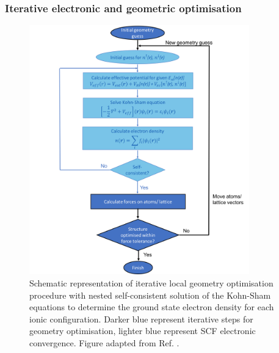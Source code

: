 \documentclass[11pt, twoside]{report}
\begin{document}
\subsubsection{Iterative electronic and geometric optimisation}
\begin{figure}[h!]
  \centering
    \includegraphics[width=0.85\textwidth]{figures/scf_flowchart.png}
    \caption[Schematic representation of iterative local geometry optimisation procedure with nested self-consistent solution of the Kohn-Sham equations to determine the ground state electron density for each ionic configuration. Darker blue represent iterative steps for geometry optimisation, lighter blue represent SCF electronic convergence.]{Schematic representation of iterative local geometry optimisation procedure with nested self-consistent solution of the Kohn-Sham equations to determine the ground state electron density for each ionic configuration. Darker blue represent iterative steps for geometry optimisation, lighter blue represent SCF electronic convergence. Figure adapted from Ref. .}
    \label{SCF_flowchart}
\end{figure}
\end{document}

